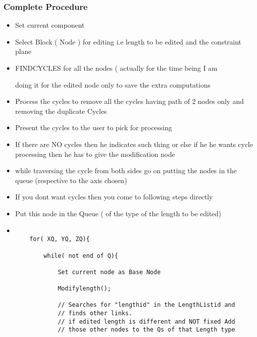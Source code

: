 
 
    \subsubsection{Complete Procedure}
 
    \begin{itemize}
 
    \item
   Set current component
    \item
   Select Block ( Node ) for editing
    i.e length to be edited and the constraint plane
 
    \item
   FINDCYCLES for all the nodes ( actually for the time being I am
 
    doing it for the edited node only to save the extra computations
 
    \item
   Process the cycles to remove all the cycles having path of 2 nodes
    only and removing the duplicate Cycles
 
    \item
   Present the cycles to the user to pick for processing
 
    \item
   If there are NO cycles then he indicates such thing or else if he
    he wants cycle processing then he has to give the modification node
 
    \item
   while traversing the cycle from both sides go on putting the  nodes
    in the queue (respective to the axis chosen)
 
    \item
   If you dont want cycles then you come to following steps directly
 
    \item
   Put this node in the Queue ( of the type of the length to be edited)
 
    \item
 
    \begin{verbatim}
 
    for( XQ, YQ, ZQ){
 
        while( not end of Q){
 
            Set current node as Base Node
 
            Modifylength();
 
            // Searches for "lengthid" in the LengthListid and
            // finds other links.
            // if edited length is different and NOT fixed Add
            // those other nodes to the Qs of that Length type
 

\end{verbatim}
\end{itemize}
